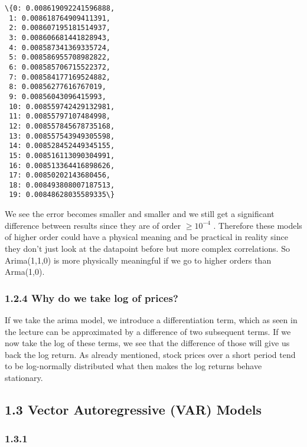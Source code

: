 \documentclass[11pt]{article}
\makeatletter
\newcommand{\boxspacing}{\kern\kvtcb@left@rule\kern\kvtcb@boxsep}
\newcommand{\prompt}[4]{
        {\ttfamily\llap{{\color{#2}[#3]:\hspace{3pt}#4}}\vspace{-\baselineskip}}
    }
\makeatother
\begin{document}
            \begin{tcolorbox}[breakable, size=fbox, boxrule=.5pt, pad at break*=1mm, opacityfill=0]
\prompt{Out}{outcolor}{114}{\boxspacing}
\begin{Verbatim}[commandchars=\\\{\}]
\{0: 0.008619092241596888,
 1: 0.008618764909411391,
 2: 0.008607195181514937,
 3: 0.008606681441828943,
 4: 0.008587341369335724,
 5: 0.008586955708982822,
 6: 0.008585706715522372,
 7: 0.008584177169524882,
 8: 0.00856277616767019,
 9: 0.00856043096415993,
 10: 0.008559742429132981,
 11: 0.00855797107484998,
 12: 0.008557845678735168,
 13: 0.008557543949305598,
 14: 0.008528452449345155,
 15: 0.008516113090304991,
 16: 0.008513364416898626,
 17: 0.00850202143680456,
 18: 0.008493808007187513,
 19: 0.00848628035589335\}
\end{Verbatim}
\end{tcolorbox}
        
    We see the error becomes smaller and smaller and we still get a
significant difference between results since they are of order
\(\geq 10^{-4}\) . Therefore these models of higher order could have a
physical meaning and be practical in reality since they don't just look
at the datapoint before but more complex correlations. So Arima(1,1,0)
is more physically meaningful if we go to higher orders than Arma(1,0).

    \hypertarget{why-do-we-take-log-of-prices}{%
\subsubsection{1.2.4 Why do we take log of
prices?}\label{why-do-we-take-log-of-prices}}

    If we take the arima model, we introduce a differentiation term, which
as seen in the lecture can be approximated by a difference of two
subsequent terms. If we now take the log of these terms, we see that the
difference of those will give us back the log return. As already
mentioned, stock prices over a short period tend to be log-normally
distributed what then makes the log returns behave stationary.

    \hypertarget{vector-autoregressive-var-models}{%
\subsection{1.3 Vector Autoregressive (VAR)
Models}\label{vector-autoregressive-var-models}}

    \hypertarget{section}{%
\subsubsection{1.3.1}\label{section}}
\end{document}
